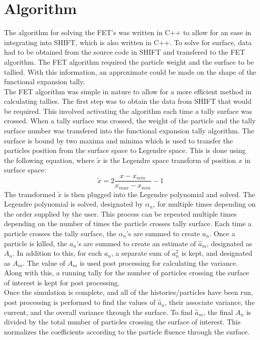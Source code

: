 \documentclass[10tma4paper]{article}
\begin{document}
\section{Algorithm}\label{algorith}
The algorithm for solving the FET's was written in C++ to allow for an ease in integrating into SHIFT, which is also written in C++. To solve for surface, data had to be obtained from the source code in SHIFT and transfered to the FET algorithm. The FET algorithm required the particle weight and the surface to be tallied. With this information, an approximate could be made on the shape of the functional expansion tally.
\\
The FET algorithm was simple in nature to allow for a more efficient method in calculating tallies. The first step was to obtain the data from SHIFT that would be required. This involved activating the algorithm each time a tally surface was crossed. When a tally surface was crossed, the weight of the particle and the tally surface number was transfered into the functional expansion tally algorithm. The surface is bound by two maxima and minima which is used to transfer the particles position from the surface space to Legendre space. This is done using the following equation, where $\tilde{x}$ is the Legendre space transform of position $x$ in surface space:
\begin{equation} \label{eq:8}
\tilde{x} = 2 \frac{x-x_{min}}{x_{max}-x_{min}} - 1
\end{equation}
The transformed $\tilde{x}$ is then plugged into the Legendre polynomial and solved. The Legendre polynomial is solved, designated by $\alpha_{n}$, for multiple times depending on the order supplied by the user. This process can be repeated multiple times depending on the number of times the particle crosses tally surface. Each time a particle crosses the tally surface, the $\alpha_{n}$'s are summed to create $a_{n}$. Once a particle is killed, the $a_{n}$'s are summed to create an estimate of $\hat{a}_{m}$, designated as $A_{n}$. In addition to this, for each $a_{n}$, a separate sum of $a_{n}^{2}$ is kept, and designated as $A_{m}$. The value of $A_{m}$ is used post processing for calculating the variance. Along with this, a running tally for the number of particles crossing the surface of interest is kept for post processing.
\\
Once the simulation is complete, and all of the histories/particles have been run, post processing  is performed to find the values of $\hat{a}_{n}$, their associate variance, the current, and the overall variance through the surface. To find $\hat{a}_{m}$, the final $A_{n}$ is divided by the total number of particles crossing the surface of interest. This normalizes the coefficients according to the particle fluence through the surface. \\
\end{document}
